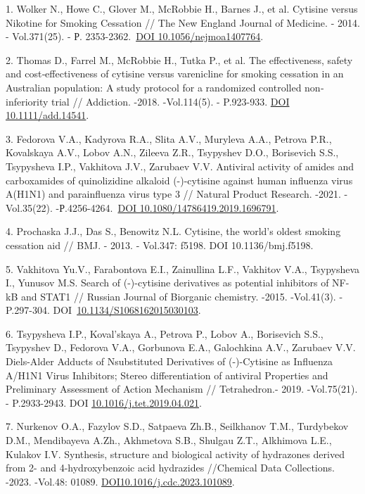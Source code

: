 \begin{refs}
1. Wolker N., Howe C., Glover M., McRobbie H., Barnes J., et al.
Cytisine versus Nikotine for Smoking Cessation // The New England
Journal of Medicine. - 2014. - Vol.371(25). - Р.
2353-2362.~\href{https://doi.org/10.1056/nejmoa1407764}{DOI
10.1056/nejmoa1407764}.

2. Thomas D., Farrel M., McRobbie H., Tutka P., et al. The
effectiveness, safety and cost‐effectiveness of cytisine versus
varenicline for smoking cessation in an Australian population: A study
protocol for a randomized controlled non‐inferiority trial // Addiction.
-2018. -Vol.114(5). - P.923-933.
\href{https://doi.org/10.1111/add.14541}{DOI 10.1111/add.14541}.

3. Fedorova V.A., Kadyrova R.A., Slita A.V., Muryleva A.A., Petrova
P.R., Kovalskaya A.V., Lobov A.N., Zileeva Z.R., Tsypyshev D.O.,
Borisevich S.S., Tsypysheva I.P., Vakhitova J.V., Zarubaev V.V.
Antiviral activity of amides and carboxamides of quinolizidine alkaloid
(-)-cytisine against human influenza virus A(H1N1) and parainfluenza
virus type 3 // Natural Product Research. -2021. -Vol.35(22).
-Р.4256-4264.~\href{https://doi.org/10.1080/14786419.2019.1696791}{DOI
10.1080/14786419.2019.1696791}.

4. Prochaska J.J., Das S., Benowitz N.L. Cytisine, the world's oldest
smoking cessation aid // BMJ. ­- 2013. - Vol.347: f5198. DOI
10.1136/bmj.f5198.

5. Vakhitova Yu.V., Farabontova E.I., Zainullina L.F., Vakhitov V.A.,
Tsypysheva I., Yunusov M.S. Search of (-)-cytisine derivatives as
potential inhibitors of NF-kB and STAT1 // Russian Journal of Biorganic
chemistry. -2015. -Vol.41(3). -P.297-304.
DOI~\href{http://dx.doi.org/10.1134/S1068162015030103}{10.1134/S1068162015030103}.

6. Tsypysheva I.P., Koval'skaya A., Petrova P., Lobov A., Borisevich
S.S., Tsypyshev D., Fedorova V.A., Gorbunova E.A., Galochkina A.V.,
Zarubaev V.V. Diels-Alder Adducts of Nsubstituted Derivatives of
(-)-Cytisine as Influenza A/H1N1 Virus Inhibitors; Stereo
differentiation of antiviral Properties and Preliminary Assessment of
Action Mechanism // Tetrahedron.- 2019. -Vol.75(21). - P.2933-2943.
DOI
\href{https://doi.org/10.1016/j.tet.2019.04.021}{10.1016/j.tet.2019.04.021}.

7. Nurkenov O.A., Fazylov S.D., Satpaeva Zh.B., Seilkhanov T.M.,
Turdybekov D.M., Mendibayeva A.Zh., Akhmetova S.B., Shulgau Z.T.,
Alkhimova L.E., Kulakov I.V. Synthesis, structure and biological
activity of hydrazones derived from 2- and 4-hydroxybenzoic acid
hydrazides //Chemical Data Collections. -2023. -Vol.48: 01089.
\href{https://doi.org/10.1016/j.cdc.2023.101089}{DOI10.1016/j.cdc.2023.101089}.


\end{refs}
